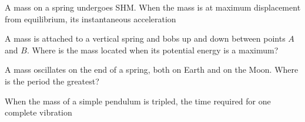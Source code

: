 \documentclass{ximera}
\begin{document}
\begin{question}
A mass on a spring undergoes SHM. When the mass is at maximum displacement from equilibrium, its instantaneous acceleration
\begin{solution}
\begin{multiple-choice}
\end{multiple-choice}
\end{solution}
\end{question}

\begin{question}
A mass is attached to a vertical spring and bobs up and down between points $A$ and $B$. Where is the mass located when its potential
energy is a maximum?
\begin{solution}
\begin{multiple-choice}
\end{multiple-choice}
\end{solution}
\end{question}

\begin{question}
A mass oscillates on the end of a spring, both on Earth and on the Moon. Where is the period the greatest?
\begin{solution}
\begin{multiple-choice}
\end{multiple-choice}
\end{solution}
\end{question}

\begin{question}
When the mass of a simple pendulum is tripled, the time required for one complete vibration
\begin{solution}
\begin{multiple-choice}
\end{multiple-choice}
\end{solution}
\end{question}
\end{document}
